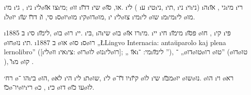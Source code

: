   \i{מי} \i{גי} , \i{ני} \i{לי}\o{צו}  \u{או}\i{מי};  \o{זו}   \i{ד}\u{דו} \i{שי} \o{או},   \u{סו}.  \i{לי} ( \i{ע} \i{טי}\i{ני}, \i{תי}, \i{ני} \i{וי}\i{ני}) \i{ה}\i{גי} ,  \u{או}\i{מי} \i{רי} \i{ל}\o{יו}  \i{ד}\u{דו} \u{שו} \i{סי}, \u{ו}    \i{ס}\o{יו}\o{מו} \i{קי}\o{דו}\o{מו},  \i{י}  \i{לי}\o{צו}  \i{מי}\i{לי} \o{שו} \i{מ}\i{מי}\i{לי} \o{מו}.

\i{ב} 1885 \i{סי}  \i{לי}\u{מו},  \o{בו} \o{רו} \i{יי}. \i{בּי}, \i{ה}\i{שי} \o{בו}  \o{רו}  \u{או}\i{מי}.  \i{יי} \i{חי} \i{מי}\u{מו} \i{פּ}\u{סו} \o{חו}   ,  \i{קי}   \i{פּי} \o{חו}\o{נו} \i{תי}. \i{ב} 1887  \o{או} \o{סו} \i{ס}\o{רו} „\L{Lingvo Internacia: antaŭparolo kaj plena lernolibro}” ([\i{לי}\o{וו} \i{אי}\i{צי}: \o{רו}\o{לו}   \o{נו}\i{לי}\o{רו}]; „ \u{או}\i{מי}:  ־\i{לי}\u{מו} ”),  ־ „\o{דו}\o{טו}\o{רו} \o{טו}” (\o{דו}\o{טו} ), \u{ו}\i{מ} \o{קו}    .

%
{רח׳ \o{הו} ־\i{בי}}
 \o{הו},   \o{לא} \i{הי}  \i{לי} \i{ת}\o{שו},   \i{לי}  \o{יו}  \u{דו}־\i{ק}\u{יו} \o{לו}  \i{שי} \i{מ}\u{בּו}\o{יו} \o{שו}\o{נו}. \o{הו} \i{וי} \o{רא}  \u{כו}\o{יו}־\o{יו}\i{רי} \o{כ}  , \i{כי}    \o{דו} \o{עו} \u{כו}\o{לו}.

